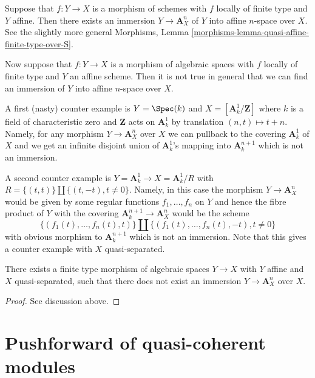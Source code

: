 \medskip\noindent
Suppose that $f : Y \to X$ is a morphism of schemes with $f$
locally of finite type and $Y$ affine. Then there exists an immersion
$Y \to \mathbf{A}^n_X$ of $Y$ into affine $n$-space over $X$.
See the slightly more general
Morphisms, Lemma \ref{morphisms-lemma-quasi-affine-finite-type-over-S}.

\medskip\noindent
Now suppose that $f : Y \to X$ is a morphism of algebraic spaces with
$f$ locally of finite type and $Y$ an affine scheme. Then it is not
true in general that we can find an immersion of $Y$ into affine
$n$-space over $X$.

\medskip\noindent
A first (nasty) counter example is $Y = \Spec(k)$ and
$X = [\mathbf{A}^1_k/\mathbf{Z}]$ where $k$ is a field of characteristic zero
and $\mathbf{Z}$ acts on $\mathbf{A}^1_k$ by translation $(n, t) \mapsto t + n$.
Namely, for any morphism $Y \to \mathbf{A}^n_X$ over $X$ we can pullback to
the covering $\mathbf{A}^1_k$ of $X$ and we get an infinite disjoint union of
$\mathbf{A}^1_k$'s mapping into $\mathbf{A}^{n + 1}_k$ which is not an
immersion.

\medskip\noindent
A second counter example is $Y = \mathbf{A}^1_k \to X = \mathbf{A}^1_k/R$
with $R = \{(t, t)\} \coprod \{(t, -t), t \not = 0\}$. Namely, in
this case the morphism $Y \to \mathbf{A}^n_X$ would be given by some
regular functions $f_1, \ldots, f_n$ on $Y$ and hence the
fibre product of $Y$ with the covering
$\mathbf{A}^{n + 1}_k \to \mathbf{A}^n_X$
would be the scheme
$$
\{(f_1(t), \ldots, f_n(t), t)\} \coprod
\{(f_1(t), \ldots, f_n(t), -t), t \not = 0\}
$$
with obvious morphism to $\mathbf{A}^{n + 1}_k$ which is not an immersion.
Note that this gives a counter example with $X$ quasi-separated.

\begin{lemma}
\label{lemma-cannot-embed-into-affine}
There exists a finite type morphism of algebraic spaces $Y \to X$
with $Y$ affine and $X$ quasi-separated, such that there does not exist
an immersion $Y \to \mathbf{A}^n_X$ over $X$.
\end{lemma}

\begin{proof}
See discussion above.
\end{proof}










\section{Pushforward of quasi-coherent modules}
\label{section-push-quasi-coherent}

